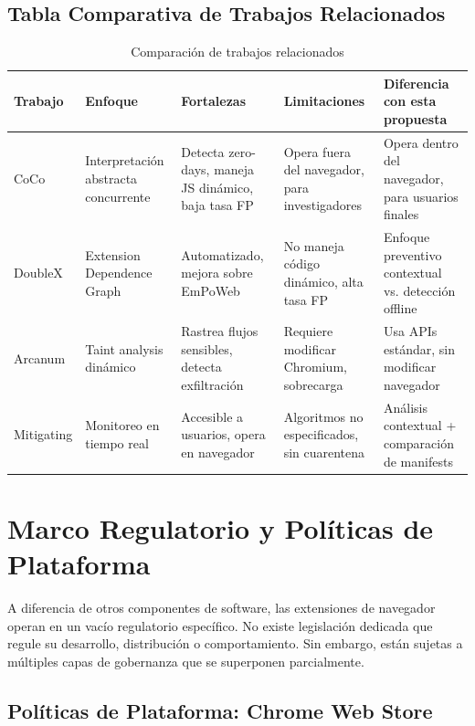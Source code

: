 \documentclass[12pt,oneside]{report}
\begin{document}
\subsection{Tabla Comparativa de Trabajos Relacionados}

\begin{table}[!htbp]
\centering
\small
\begin{tabular}{|p{2.5cm}|p{2.5cm}|p{3cm}|p{3cm}|p{3cm}|}
\hline
\textbf{Trabajo} & \textbf{Enfoque} & \textbf{Fortalezas} & \textbf{Limitaciones} & \textbf{Diferencia con esta propuesta} \\
\hline
CoCo \cite{yu2023coco} & Interpretación abstracta concurrente & Detecta zero-days, maneja JS dinámico, baja tasa FP & Opera fuera del navegador, para investigadores & Opera dentro del navegador, para usuarios finales \\
\hline
DoubleX \cite{doublex} & Extension Dependence Graph & Automatizado, mejora sobre EmPoWeb & No maneja código dinámico, alta tasa FP & Enfoque preventivo contextual vs. detección offline \\
\hline
Arcanum \cite{arcanum} & Taint analysis dinámico & Rastrea flujos sensibles, detecta exfiltración & Requiere modificar Chromium, sobrecarga & Usa APIs estándar, sin modificar navegador \\
\hline
Mitigating \cite{sam2023mitigating} & Monitoreo en tiempo real & Accesible a usuarios, opera en navegador & Algoritmos no especificados, sin cuarentena & Análisis contextual + comparación de manifests \\
\hline
\end{tabular}
\caption{Comparación de trabajos relacionados}
\end{table}

\section{Marco Regulatorio y Políticas de Plataforma}

A diferencia de otros componentes de software, las extensiones de navegador operan en un vacío regulatorio específico. No existe legislación dedicada que regule su desarrollo, distribución o comportamiento. Sin embargo, están sujetas a múltiples capas de gobernanza que se superponen parcialmente.

\subsection{Políticas de Plataforma: Chrome Web Store}
\end{document}
